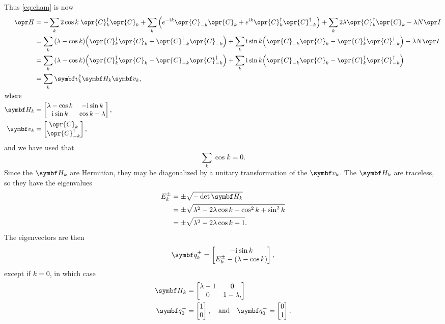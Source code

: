 \documentclass[../thesis.tex]{subfiles}
\begin{document}
Thus \cref{eq:cham} is now
\begin{align}
  \ham
  &= -\sum_k 2 \cos k\; \opr{C}_k^\dag \opr{C}_k
  + \sum_k \qty(%
  e^{-\im k} \opr{C}_{-k} \opr{C}_k
  + e^{\im k} \opr{C}_k^\dag \opr{C}_{-k}^\dag
  )
  + \sum_k 2\lambda\opr{C}_k^\dag\opr{C}_k
  - \lambda N \idopr
  \\
  &= \sum_k \qty(\lambda - \cos k)
  \qty(%
  \opr{C}_k^\dag \opr{C}_k
  + \opr{C}_{-k}^\dag \opr{C}_{-k}
  )
  + \sum_k \im\sin k
  \qty(%
  \opr{C}_{-k}\opr{C}_k
  - \opr{C}_k^\dag\opr{C}_{-k}^\dag
  )
  - \lambda N \idopr
  \\
  &= \sum_k \qty(\lambda - \cos k)
  \qty(%
  \opr{C}_k^\dag \opr{C}_k
  - \opr{C}_{-k} \opr{C}_{-k}^\dag
  )
  + \sum_k \im\sin k
  \qty(%
  \opr{C}_{-k}\opr{C}_k
  - \opr{C}_k^\dag\opr{C}_{-k}^\dag
  ) \\
  &= \sum_k \vq{v}_k^\dag \mq{H}_k \vq{v}_k,
  \label{eq:Cham} \\
  \shortintertext{where}
  \mq{H}_k
  &= \bmqty{%
  \lambda - \cos k & -\im\sin k \\
  \im\sin k & \cos k - \lambda
  }, \\
  \vq{v}_k
  &= \bmqty{\opr{C}_k \\ \opr{C}_{-k}^\dag},
\end{align}
and we have used that
\begin{equation}
  \sum_k \cos k = 0.
\end{equation}
Since the $\mq{H}_k$ are Hermitian, they may be diagonalized by a unitary
transformation of the $\vq{v}_k$. The $\mq{H}_k$ are traceless, so they have the
eigenvalues
\begin{align}
  E_k^\pm
  &= \pm\sqrt{-\det\mq{H}_k} \\
  &= \pm\sqrt{\lambda^2 - 2\lambda\cos k + \cos^2 k + \sin^2 k} \\
  &= \pm\sqrt{\lambda^2 - 2\lambda\cos k + 1}.
\end{align}
The eigenvectors are then
\begin{equation}
  \vq{q}_k^\pm
  = \bmqty{%
    -\im\sin k \\
    E_k^\pm - (\lambda - \cos k)
  },
\end{equation}
except if $k = 0$, in which case
\begin{align}
  \mq{H}_k
  &= \bmqty{%
    \lambda - 1 & 0 \\
    0 & 1 - \lambda,
  } \\
  \vq{q}_0^+
  &= \bmqty{1 \\ 0},
  \qand
  \vq{q}_0^-
  = \bmqty{0 \\ 1}.
\end{align}
\end{document}
